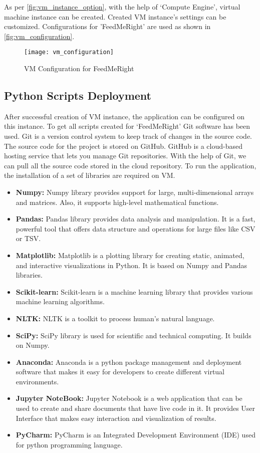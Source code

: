 \noindent As per \autoref{fig:vm_instance_option}, with the help of `Compute Engine', virtual machine instance can be created. Created VM instance's settings can be customized. Configurations for 'FeedMeRight' are used as shown in \autoref{fig:vm_configuration}.
\begin{figure}[H]
	\centering
	\texttt{[image: vm\_configuration]}
	\caption{VM Configuration for FeedMeRight}
	\label{fig:vm_configuration}
\end{figure}

\subsection{Python Scripts Deployment}
After successful creation of VM instance, the application can be configured on this instance. To get all scripts created for `FeedMeRight' Git software has been used. Git is a version control system to keep track of changes in the source code. The source code for the project is stored on GitHub. GitHub is a cloud-based hosting service that lets you manage Git repositories. With the help of Git, we can pull all the source code stored in the cloud repository. To run the application, the installation of a set of libraries are required on VM. 

\begin{itemize}
\item \textbf{Numpy: } Numpy library provides support for large, multi-dimensional arrays and matrices. Also, it supports high-level mathematical functions.
\item \textbf{Pandas: } Pandas library provides data analysis and manipulation. It is a fast, powerful tool that offers data structure and operations for large files like CSV or TSV.
\item \textbf{Matplotlib: } Matplotlib is a plotting library for creating static, animated, and interactive visualizations in Python. It is based on Numpy and Pandas libraries.
\item \textbf{Scikit-learn: } Scikit-learn is a machine learning library that provides various machine learning algorithms.
\item \textbf{NLTK: } NLTK is a toolkit to process human's natural language.
\item \textbf{SciPy: } SciPy library is used for scientific and technical computing. It builds on Numpy. 
\item \textbf{Anaconda: } Anaconda is a python package management and deployment software that makes it easy for developers to create different virtual environments.  
\item \textbf{Jupyter NoteBook: } Jupyter Notebook is a web application that can be used to create and share documents that have live code in it. It provides User Interface that makes easy interaction and visualization of results. 
\item \textbf{PyCharm: } PyCharm is an Integrated Development Environment (IDE) used for python programming language. 
\end{itemize}  